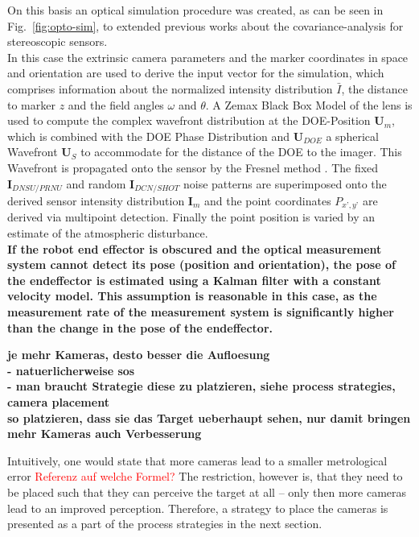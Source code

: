 \documentclass[5p,times,procedia]{elsarticle}
\begin{document}
On this basis an optical simulation procedure was created, as can be seen in Fig.~\ref{fig:opto-sim}, to extended previous works \cite{Liu_2021,Di_Leo_2011} about the covariance-analysis for stereoscopic sensors.
\\
In this case the extrinsic camera parameters and the marker coordinates in space and orientation are used to derive
the input vector for the simulation, which comprises information about the normalized intensity distribution $\bar{I}$, the distance to marker $z$ and the field angles $\omega$ and $\theta$. A Zemax Black Box Model of the lens is used to compute the complex wavefront distribution at the DOE-Position $\mathbf{U}_m$, which is combined with the DOE Phase Distribution and $\mathbf{U}_{DOE}$ a spherical Wavefront $\mathbf{U}_{S}$ to accommodate for the distance of the DOE to the imager. This Wavefront is propagated onto the sensor by the Fresnel method \cite{Goodman2005}. The fixed $\mathbf{I}_{DNSU/PRNU}$ and random $\mathbf{I}_{DCN/SHOT}$ noise patterns are superimposed onto the derived sensor intensity distribution $\mathbf{I}_m$ and the point coordinates $P_{x’,y’}$ are derived via multipoint detection.
Finally the point position is varied by an estimate of the atmospheric disturbance.\\


\textbf{
If the robot end effector is obscured and the optical measurement system cannot detect its pose (position and orientation), the pose of the endeffector is estimated using a Kalman filter with a constant velocity model. This assumption is reasonable in this case, as the measurement rate of the measurement system is significantly higher than the change in the pose of the endeffector.}

\textbf{
je mehr Kameras, desto besser die Aufloesung \\
- natuerlicherweise sos \\
- man braucht Strategie diese zu platzieren, siehe process strategies, camera placement \\
so platzieren, dass sie das Target ueberhaupt sehen, nur damit bringen mehr Kameras auch Verbesserung }

% 
Intuitively, one would state that more cameras lead to a smaller metrological error
\textcolor{red}{Referenz auf welche Formel?}
The restriction, however is, that they need to be placed such that they can perceive the target at all -- only then more cameras lead to an improved perception.
Therefore, a strategy to place the cameras is presented as a part of the process strategies in the next section.
\end{document}
